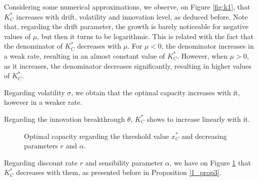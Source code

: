 Considering some numerical approximations, we observe, on Figure \ref{fig:k1}, that $K^*_C$ increases with drift, volatility and innovation level, as deduced before. Note that, regarding the drift parameter, the growth is barely noticeable for negative values of $\mu$, but then it turns to be logarithmic.
This is related with the fact that the denominator of $K_C^*$ decreases with $\mu$. For $\mu<0$, the denominator increases in a weak rate, resulting in an almost constant value of $K^*_C$. However, when $\mu>0$, as it increases, the denominator decreases significantly, resulting in higher values of $K^*_C$.

Regarding volatility $\sigma$, we obtain that the optimal capacity increases with it, however in a weaker rate.

Regarding the innovation breakthrough $\theta$, $K^*_C$ shows to increase linearly with it.

\begin{figure}[!htb]
	\begin{subfigmatrix}{2}
	\end{subfigmatrix}
	\caption{Optimal capacity regarding the threshold value $x^*_C$ and decreasing parameters $r$ and $\alpha$.}
	\label{fig:k2}
\end{figure}

Regarding discount rate $r$ and sensibility parameter $\alpha$, we have on Figure \ref{fig:k2} that $K^*_C$ decreases with them, as presented before in Proposition \ref{1_prop3}.
 
